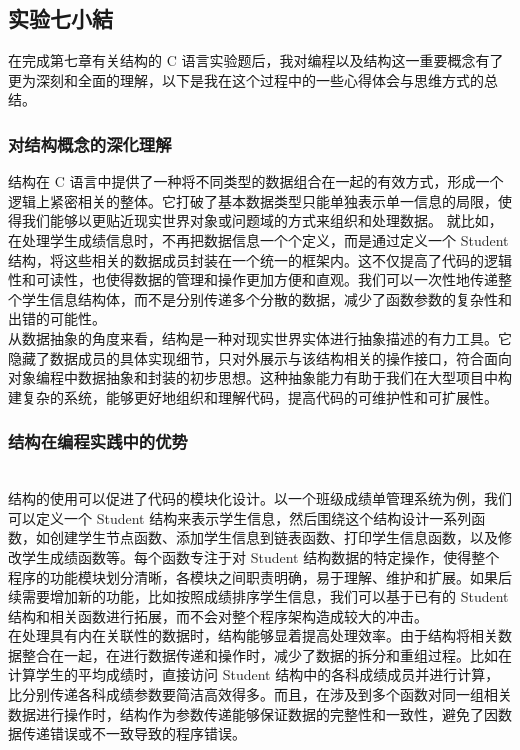 \documentclass[supercite]{Experimental_Report}
\theoremstyle{definition}
\begin{document}
		
		\subsection{实验七小結}
		在完成第七章有关结构的 C 语言实验题后，我对编程以及结构这一重要概念有了更为深刻和全面的理解，以下是我在这个过程中的一些心得体会与思维方式的总结。
		\subsubsection{对结构概念的深化理解}
		结构在 C 语言中提供了一种将不同类型的数据组合在一起的有效方式，形成一个逻辑上紧密相关的整体。它打破了基本数据类型只能单独表示单一信息的局限，使得我们能够以更贴近现实世界对象或问题域的方式来组织和处理数据。
		就比如，在处理学生成绩信息时，不再把数据信息一个个定义，而是通过定义一个 Student 结构，将这些相关的数据成员封装在一个统一的框架内。这不仅提高了代码的逻辑性和可读性，也使得数据的管理和操作更加方便和直观。我们可以一次性地传递整个学生信息结构体，而不是分别传递多个分散的数据，减少了函数参数的复杂性和出错的可能性。
		\\从数据抽象的角度来看，结构是一种对现实世界实体进行抽象描述的有力工具。它隐藏了数据成员的具体实现细节，只对外展示与该结构相关的操作接口，符合面向对象编程中数据抽象和封装的初步思想。这种抽象能力有助于我们在大型项目中构建复杂的系统，能够更好地组织和理解代码，提高代码的可维护性和可扩展性。
		\subsubsection{结构在编程实践中的优势}
		\\结构的使用可以促进了代码的模块化设计。以一个班级成绩单管理系统为例，我们可以定义一个 Student 结构来表示学生信息，然后围绕这个结构设计一系列函数，如创建学生节点函数、添加学生信息到链表函数、打印学生信息函数，以及修改学生成绩函数等。每个函数专注于对 Student 结构数据的特定操作，使得整个程序的功能模块划分清晰，各模块之间职责明确，易于理解、维护和扩展。如果后续需要增加新的功能，比如按照成绩排序学生信息，我们可以基于已有的 Student 结构和相关函数进行拓展，而不会对整个程序架构造成较大的冲击。
		\\在处理具有内在关联性的数据时，结构能够显着提高处理效率。由于结构将相关数据整合在一起，在进行数据传递和操作时，减少了数据的拆分和重组过程。比如在计算学生的平均成绩时，直接访问 Student 结构中的各科成绩成员并进行计算，比分别传递各科成绩参数要简洁高效得多。而且，在涉及到多个函数对同一组相关数据进行操作时，结构作为参数传递能够保证数据的完整性和一致性，避免了因数据传递错误或不一致导致的程序错误。
\end{document}

